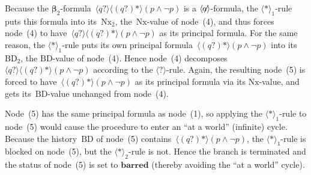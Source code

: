 \documentclass{entcs}
\newcommand{\pnot}[1]{\lnot #1}
\newcommand{\pand}[2]{#1 \land #2}
\newcommand{\pea}[2]{\langle#1\rangle #2}
\newcommand{\prp}[1]{#1*}
\newcommand{\pip}[1]{#1?}
\newcommand{\fean}{$\pea{\not\!\!a}{}$}
\newcommand{\tnext}{\mathrm{Nx}}
\newcommand{\tbdia}{\mathrm{BD}}
\newcommand{\tbeta}{\boldsymbol{\beta}}
\newcommand{\trei}{$\pea{\pip{}}{}$}
\newcommand{\trero}{$\pea{\prp{}}{}_1$}
\newcommand{\trert}{$\pea{\prp{}}{}_2$}
\newcommand{\tloop}{\mathbf{barred}}
\newcommand{\extst}{\pea{\prp{(\pip{q})}}{(\pand{p}{\pnot{p}})}}
\begin{document}
Because the $\tbeta_2$-formula~$\pea{\pip{q}}{\extst}$ is a \fean{}-formula,
the \trero{}-rule puts this formula into its~$\tnext_2$,
the~$\tnext$-value of node~(4),
and thus forces node~(4) to have~$\pea{\pip{q}}{\extst}$ as its principal formula.
For the same reason, 
the \trero{}-rule puts its own principal formula~$\extst$
into its~$\tbdia_2$, the $\tbdia$-value of node~(4).
Hence node~(4) decomposes~$\pea{\pip{q}}{\extst}$ according to the \trei{}-rule.
Again, the resulting node~(5) is forced to have~$\extst$ as its principal formula
via its $\tnext$-value, and gets its~$\tbdia$-value unchanged from node~(4).

Node~(5) has the same principal formula as node~(1),
so applying the \trero{}-rule to node~(5) would cause
the procedure to enter an ``at a world'' (infinite) cycle.
Because the history~$\tbdia$ of node~(5) contains~$\extst$,
the \trero{}-rule is blocked on node~(5),
but the \trert{}-rule is not.
Hence the branch is terminated and the status of node~(5) is set to $\tloop$
(thereby avoiding the ``at a world'' cycle).
\end{document}

